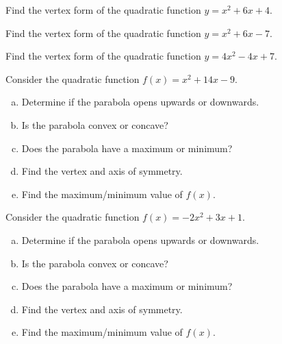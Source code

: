 \documentclass[11pt,letterpaper]{article}
\begin{document}

 Find the vertex form of the quadratic function $y= x^2 + 6x + 4$.





\newpage





 Find the vertex form of the quadratic function $y= x^2 + 6x - 7$.





\newpage





 Find the vertex form of the quadratic function $y= 4x^2 - 4x + 7$.





\newpage





 Consider the quadratic function $f(x)= x^2 + 14 x - 9$.
\begin{enumerate}[(a)]
\item Determine if the parabola opens upwards or downwards.
\item Is the parabola convex or concave?
\item Does the parabola have a maximum or minimum? 
\item Find the vertex and axis of symmetry. 
\item Find the maximum/minimum value of $f(x)$. 
\end{enumerate}





\newpage





 Consider the quadratic function $f(x)= -2x^2 + 3x + 1$.
\begin{enumerate}[(a)]
\item Determine if the parabola opens upwards or downwards.
\item Is the parabola convex or concave?
\item Does the parabola have a maximum or minimum? 
\item Find the vertex and axis of symmetry. 
\item Find the maximum/minimum value of $f(x)$. 
\end{enumerate}








\end{document}
